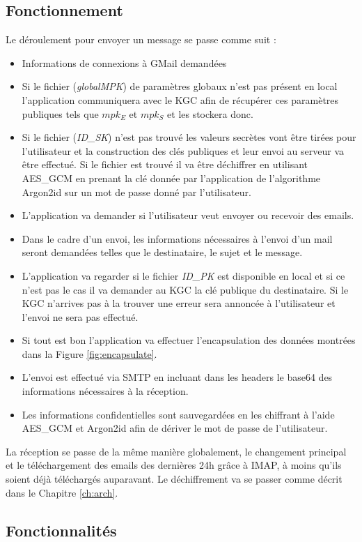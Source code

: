 \subsection{Fonctionnement}
Le déroulement pour envoyer un message se passe comme suit :
\begin{itemize}
	\item Informations de connexions à GMail demandées
	\item Si le fichier (\textit{globalMPK}) de paramètres globaux n'est pas présent en local l'application communiquera avec le KGC afin de récupérer ces paramètres publiques tels que $mpk_E$ et $mpk_S$ et les stockera donc.
	\item Si le fichier (\textit{ID\_SK}) n'est pas trouvé les valeurs secrètes vont être tirées pour l'utilisateur et la construction des clés publiques et leur envoi au serveur va être effectué. Si le fichier est trouvé il va être déchiffrer en utilisant AES\_GCM en prenant la clé donnée par l'application de l'algorithme Argon2id sur un mot de passe donné par l'utilisateur.
	\item L'application va demander si l'utilisateur veut envoyer ou recevoir des emails.
	\item Dans le cadre d'un envoi, les informations nécessaires à l'envoi d'un mail seront demandées telles que le destinataire, le sujet et le message.
	\item L'application va regarder si le fichier \textit{ID\_PK} est disponible en local et si ce n'est pas le cas il va demander au KGC la clé publique du destinataire. Si le KGC n'arrives pas à la trouver une erreur sera annoncée à l'utilisateur et l'envoi ne sera pas effectué.
	\item Si tout est bon l'application va effectuer l'encapsulation des données montrées dans la Figure \ref{fig:encapsulate}.
	\item L'envoi est effectué via SMTP en incluant dans les headers le base64 des informations nécessaires à la réception.
	\item Les informations confidentielles sont sauvegardées en les chiffrant à l'aide AES\_GCM et Argon2id afin de dériver le mot de passe de l'utilisateur.
\end{itemize}
La réception se passe de la même manière globalement, le changement principal et le téléchargement des emails des dernières 24h grâce à IMAP, à moins qu'ils soient déjà téléchargés auparavant. Le déchiffrement va se passer comme décrit dans le Chapitre \ref{ch:arch}. 
\subsection{Fonctionnalités}
